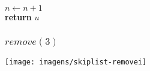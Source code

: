 \documentclass{beamer}
\begin{document}
\begin{frame}[shrink]
\begin{oframed}
\begin{flushleft}
\hspace*{1em} \hspace*{1em} \ensuremath{\ensuremath{\mathit{n}} \gets  \ensuremath{\ensuremath{\mathit{n}} + 1}}\\
\hspace*{1em} \hspace*{1em} {\color{black} \textbf{return}} \ensuremath{\ensuremath{\mathit{u}}}\\
\end{flushleft}
\end{oframed}
\end{frame}

\begin{frame}
\frametitle{$remove(3)$}
\texttt{[image: imagens/skiplist-removei]}
\end{frame}
\end{document}
